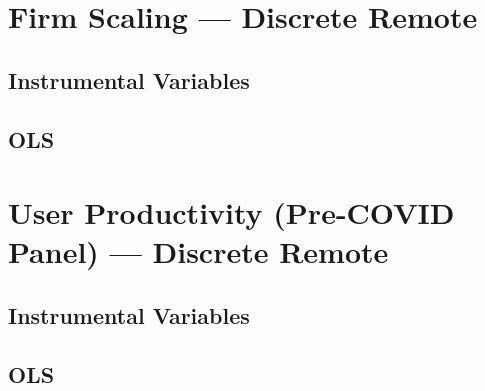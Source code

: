 \documentclass{article}
\newcommand{\cleanedresultsdir}{../../results/cleaned}
\begin{document}
\section*{Firm Scaling — Discrete Remote}
\subsection*{Instrumental Variables}

\subsection*{OLS}


\bigskip

\section*{User Productivity (Pre-COVID Panel) — Discrete Remote}
\subsection*{Instrumental Variables}

\subsection*{OLS}

\end{document}
